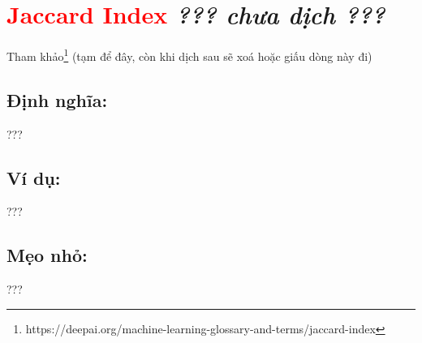 \section*{\huge \textcolor{Red}{Jaccard Index}  \small \textit{??? chưa dịch ???} }
Tham khảo\footnote{https://deepai.org/machine-learning-glossary-and-terms/jaccard-index} (tạm để đây, còn khi dịch sau sẽ xoá hoặc giấu dòng này đi)
\subsection*{Định nghĩa:}
???
\subsection*{Ví dụ:}
???
\subsection*{Mẹo nhỏ:}
???
